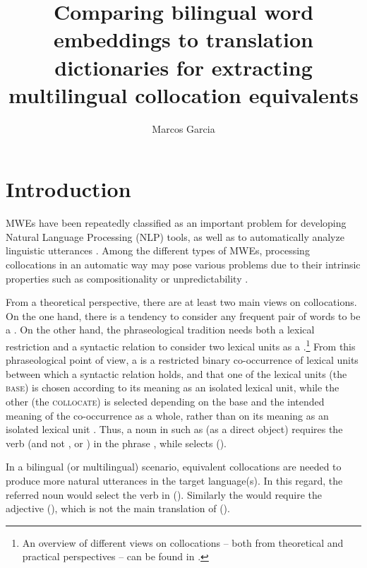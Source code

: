 \documentclass[output=paper
,modfonts
,nonflat]{langsci/langscibook}
\title{Comparing bilingual word embeddings to translation dictionaries for extracting multilingual collocation equivalents}
\author{%
 Marcos Garcia\affiliation{Universidade da Coruña}
}
\begin{document}

\maketitle
\label{GARCIA-CHAPTER}

\section{Introduction}
MWEs have been repeatedly classified as an important problem for developing
Natural Language Processing (NLP) tools, as well as to automatically analyze linguistic
utterances \citep{Sag2002a}. Among the different types of MWEs, processing
collocations in an automatic way may pose various problems due to their intrinsic properties
such as compositionality or unpredictability \citep{melcuk98}.

From a theoretical perspective, there are at least two main views on collocations.
On the one hand, there is a tendency to consider any frequent pair of words to be
a  \citep{smadja1993,evert2003,kilgarriff2006}.
On the other hand, the phraseological tradition needs both a lexical restriction and a syntactic
relation to consider two lexical units as a .\footnote{An overview of different views on collocations
  -- both from theoretical and practical perspectives -- can be found in \citet{seretan2011syntax}.}
From this phraseological point of view, a  is a restricted binary co-occurrence of lexical units
between which a syntactic relation holds, and that one of the lexical units (the \textsc{base})
is chosen according to its meaning as an isolated lexical unit, while the other (the \textsc{collocate})
is selected depending on the base and the intended meaning of the co-occurrence as a whole,
rather than on its meaning as an isolated lexical unit \citep{melcuk98}. Thus, a noun in 
such as  (as a direct object) requires the verb  (and not , or )
in the phrase , while  selects  ().

In a bilingual (or multilingual) scenario, equivalent collocations are needed
to produce more natural utterances in the target language(s). In this regard,
the referred noun  would select the verb  in  (). Similarly the   would require the adjective  (), which is not
the main translation of  ().
\end{document}
